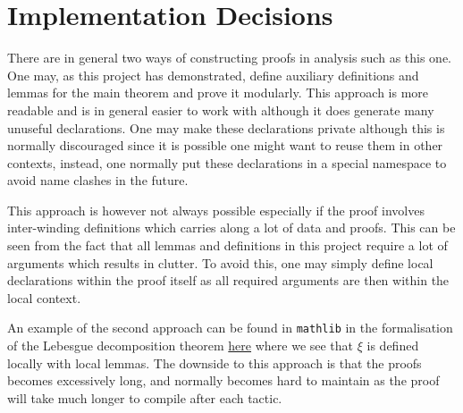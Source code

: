 \documentclass[]{article}
\theoremstyle{definition}
\begin{document}
\section*{Implementation Decisions}

There are in general two ways of constructing proofs in analysis such as this one. 
One may, as this project has demonstrated, define auxiliary definitions and lemmas 
for the main theorem and prove it modularly. This approach is more readable and 
is in general easier to work with although it does generate many unuseful 
declarations. One may make these declarations private although this is normally 
discouraged since it is possible one might want to reuse them in other contexts, 
instead, one normally put these declarations in a special namespace to avoid 
name clashes in the future.

This approach is however not always possible especially if the proof involves 
inter-winding definitions which carries along a lot of data and proofs. This can 
be seen from the fact that all lemmas and definitions in this project require 
a lot of arguments which results in clutter. To avoid this, one may simply 
define local declarations within the proof itself as all required arguments are 
then within the local context. 

An example of the second approach can be found in \texttt{mathlib} in the formalisation 
of the Lebesgue decomposition theorem 
\href{https://github.com/leanprover-community/mathlib/blob/master/src/measure_theory/decomposition/lebesgue.lean#L604}{here}
where we see that \(\xi\) is defined locally with local lemmas. The downside to this 
approach is that the proofs becomes excessively long, and normally becomes hard 
to maintain as the proof will take much longer to compile after each tactic.  
\end{document}
